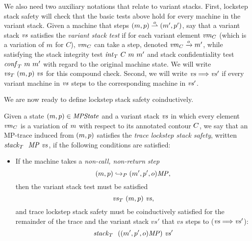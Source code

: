 \documentclass[acmsmall,review,anonymous]{acmart}\settopmatter{printfolios=true,printccs=false,printacmref=false}
\begin{document}
{%

We also need two auxiliary notations that relate to variant stacks.
%
First, lockstep stack safety will check that the basic tests above hold for every
machine in the variant stack.  Given a machine that steps $(m,
p) \overset{o}{\rightharpoonup} (m', p')$, say that a variant
stack $\mathit{vs}$ satisfies the \emph{variant stack test} if for each
variant element $\mathit{vm}_{C}$ (which is a variation of $m$ for $C$),
$\mathit{vm}_{C}$ can take a step, denoted $\mathit{vm}_{C} \xrightarrow{o} m'$,
while satisfying the stack integrity test $\mathit{int}_T ~ C ~ m ~ m'$
and stack confidentiality test $\mathit{conf}_T ~ m ~ m'$ with regard
to the original machine state. We will write $\mathit{\mathit{vs}}_T ~ (m,
  p) ~ \mathit{vs}$ for this compound check.
%
Second, we will write $\mathit{vs} \Longrightarrow \mathit{vs}'$ if every variant machine
in $\mathit{vs}$ steps to the corresponding machine in $\mathit{vs}'$.
%

We are now ready to define lockstep stack safety coinductively.

 Given a state $(m, p) \in \mathit{MPState}$ and a variant stack
$\mathit{vs}$ in which every element $\mathit{vm}_{C}$ is a variation of $m$
with respect to its annotated contour $C$, we say that an
MP-trace induced from $(m, p)$ satisfies the \emph{trace
  lockstep stack safety}, written $\mathit{stack}_T ~  ~ \mathit{MP} ~ \mathit{vs}$, if the
following conditions are satisfied:

\begin{itemize}

\item
  If the machine takes a \emph{non-call, non-return step}
  \[(m, p) \hookrightarrow_P (m', p', o)\mathit{MP},\]
  then the variant stack test must be satisfied
  \[\mathit{\mathit{vs}}_T ~ (m, p) ~ \mathit{vs},\]
  and trace lockstep stack safety must be coinductively satisfied for
  the remainder of the trace and the variant stack $vs'$ that $vs$
  steps to ($\mathit{vs} \Longrightarrow \mathit{vs}'$):
  \[ \mathit{stack}_T ~  ~ ((m',p',o)\mathit{MP}) ~ \mathit{vs}'\]


\end{itemize}}
\end{document}
